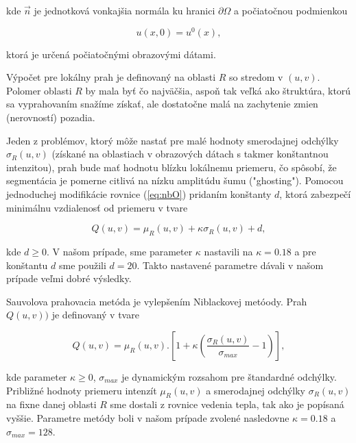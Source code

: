 \documentclass[a4paper,11pt,oneside]{article}%
\begin{document}
kde $\vec{n}$ je jednotková vonkajšia normála ku hranici $\partial \Omega$ a počiatočnou podmienkou 

\begin{equation}
u(x, 0) = u^0(x),
\end{equation}

ktorá je určená počiatočnými obrazovými dátami.

Výpočet pre lokálny prah je definovaný na oblasti $R$ so stredom v $(u, v)$. Polomer oblasti $R$ by mala byť čo najväčšia, aspoň tak veľká ako štruktúra, ktorú sa vyprahovaním snažíme získať, ale dostatočne malá na zachytenie zmien (nerovností) pozadia.

Jeden z problémov, ktorý môže nastať pre malé hodnoty smerodajnej odchýlky $\sigma_R(u,v)$ (získané na oblastiach v obrazových dátach s takmer konštantnou intenzitou), prah bude mať hodnotu blízku lokálnemu priemeru, čo spôsobí, že segmentácia je pomerne citlivá na nízku amplitúdu šumu ("ghosting"). Pomocou jednoduchej modifikácie rovnice (\ref{eq:nbO}) pridaním konštanty $d$, ktorá zabezpečí minimálnu vzdialenosť od priemeru v tvare

\begin{equation} \label{eq:nb}
Q(u,v) = \mu_R(u,v) + \kappa\sigma_R(u,v) + d,
\end{equation}

kde $d \geq 0$. V našom prípade, sme parameter $\kappa$ nastavili na $\kappa = 0.18$ a pre konštantu $d$ sme použili $d = 20$. Takto nastavené parametre dávali v našom prípade veľmi dobré výsledky.


Sauvolova prahovacia metóda je vylepšením Niblackovej metóody. Prah $Q(u,v))$ je definovaný v tvare

\begin{equation}  \label{eq:sav}
Q(u,v) = \mu_R(u,v) . [1 + \kappa(\frac{\sigma_R(u,v)}{\sigma_{max}} - 1)],
\end{equation}

kde parameter $\kappa \geq 0$, $\sigma_{max}$ je dynamickým rozsahom pre štandardné odchýlky. Približné hodnoty priemeru intenzít $\mu_R(u,v)$ a smerodajnej odchýlky  $\sigma_R(u,v)$ na fixne danej oblasti $R$ sme dostali z rovnice vedenia tepla, tak ako je popísaná vyššie. 
Parametre metódy boli v našom prípade zvolené nasledovne $\kappa = 0.18$ a  $\sigma_{max} = 128$. 
\end{document}
